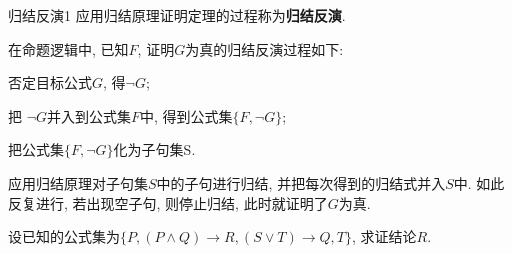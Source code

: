 \begin{mydef}{归结反演}{1}
    应用归结原理证明定理的过程称为\textbf{归结反演}.
\end{mydef}
\begin{remark}
在命题逻辑中, 已知$F$, 证明$G$为真的归结反演过程如下:

    \quad{} 否定目标公式$G$, 得$\neg G$;

    \quad{} 把 $\neg G$并入到公式集$F$中, 得到公式集$\{F, \neg G\}$;

    \quad{} 把公式集$\{F, \neg G\}$化为子句集S.

    \quad{}  应用归结原理对子句集$S$中的子句进行归结, 并把每次得到的归结式并入$S$中. 如此反复进行, 若出现空子句, 则停止归结, 此时就证明了$G$为真.
\end{remark}
\begin{example}
    设已知的公式集为$\{P, (P\wedge Q)\rightarrow R, (S\vee T)\rightarrow Q, T\}$, 求证结论$R$.
\end{example}
